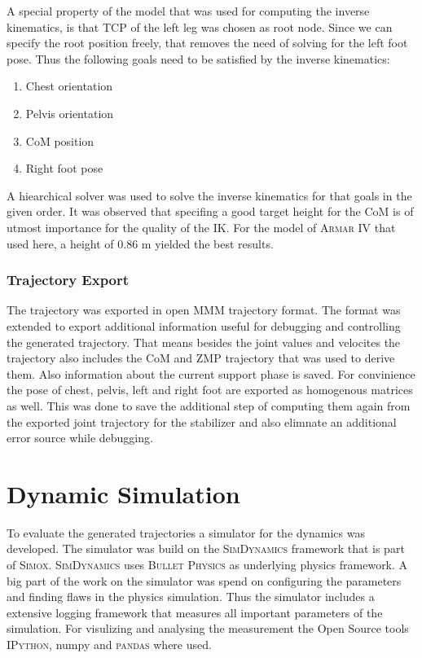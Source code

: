 \documentclass[english,ngerman]{KITreprt}
\newcommand{\name}[1]{\textsc{#1}}
\begin{document}
A special property of the model that was used for computing the inverse
kinematics, is that TCP of the left leg was chosen as root node. Since
we can specify the root position freely, that removes the need of
solving for the left foot pose. Thus the following goals need to be
satisfied by the inverse kinematics:

\begin{enumerate}
\def\labelenumi{\arabic{enumi}.}
\item
  Chest orientation
\item
  Pelvis orientation
\item
  CoM position
\item
  Right foot pose
\end{enumerate}

A hiearchical solver was used to solve the inverse kinematics for that
goals in the given order. It was observed that specifing a good target
height for the CoM is of utmost importance for the quality of the IK.
For the model of \name{Armar IV} that used here, a height of $0.86$ m
yielded the best results.

\subsection{Trajectory Export}\label{trajectory-export}

The trajectory was exported in open \name{MMM} trajectory format. The
format was extended to export additional information useful for
debugging and controlling the generated trajectory. That means besides
the joint values and velocites the trajectory also includes the CoM and
ZMP trajectory that was used to derive them. Also information about the
current support phase is saved. For convinience the pose of chest,
pelvis, left and right foot are exported as homogenous matrices as well.
This was done to save the additional step of computing them again from
the exported joint trajectory for the stabilizer and also elimnate an
additional error source while debugging.

\chapter{Dynamic Simulation}\label{dynamic-simulation}

To evaluate the generated trajectories a simulator for the dynamics was
developed. The simulator was build on the \name{SimDynamics} framework
that is part of \name{Simox}. \name{SimDynamics} uses
\name{Bullet Physics} as underlying physics framework. A big part of the
work on the simulator was spend on configuring the parameters and
finding flaws in the physics simulation. Thus the simulator includes a
extensive logging framework that measures all important parameters of
the simulation. For visulizing and analysing the measurement the Open
Source tools \name{IPython}, numpy and \name{pandas} where used.
\end{document}
